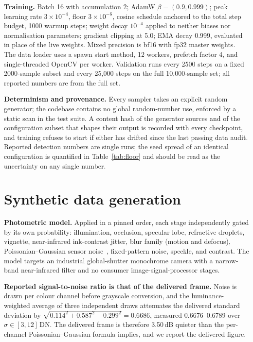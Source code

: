 \documentclass[10pt,twocolumn,letterpaper]{article}
\begin{document}
\textbf{Training.} Batch 16 with accumulation 2; AdamW $\beta = (0.9, 0.999)$; peak learning rate
$3\times10^{-4}$, floor $3\times10^{-6}$, cosine schedule anchored to the total step budget, 1000
warmup steps; weight decay $10^{-4}$ applied to neither biases nor normalisation parameters;
gradient clipping at 5.0; EMA decay 0.999, evaluated in place of the live weights. Mixed precision
is bf16 with fp32 master weights. The data loader uses a spawn start method, 12 workers, prefetch
factor 4, and single-threaded OpenCV per worker. Validation runs every 2500 steps on a fixed
2000-sample subset and every 25,000 steps on the full 10,000-sample set; all reported numbers are
from the full set.

\textbf{Determinism and provenance.} Every sampler takes an explicit random generator; the codebase
contains no global random-number use, enforced by a static scan in the test suite. A content hash
of the generator sources and of the configuration subset that shapes their output is recorded with
every checkpoint, and training refuses to start if either has drifted since the last passing data
audit. Reported detection numbers are single runs; the seed spread of an identical configuration is
quantified in Table~\ref{tab:floor} and should be read as the uncertainty on any single number.

\section{Synthetic data generation}
\label{app:data}

\textbf{Photometric model.} Applied in a pinned order, each stage independently gated by its own
probability: illumination, occlusion, specular lobe, refractive droplets, vignette, near-infrared
ink-contrast jitter, blur family (motion and defocus), Poissonian--Gaussian sensor
noise~\cite{foi2008}, fixed-pattern noise, speckle, and contrast. The model targets an industrial
global-shutter monochrome camera with a narrow-band near-infrared filter and no consumer
image-signal-processor stages.

\textbf{Reported signal-to-noise ratio is that of the delivered frame.} Noise is drawn per colour
channel before grayscale conversion, and the luminance-weighted average of three independent draws
attenuates the delivered standard deviation by
$\sqrt{0.114^2 + 0.587^2 + 0.299^2} = 0.6686$, measured 0.6676--0.6789 over
$\sigma \in [3,12]$\,DN. The delivered frame is therefore 3.50\,dB quieter than the per-channel
Poissonian--Gaussian formula implies, and we report the delivered figure.
\end{document}

